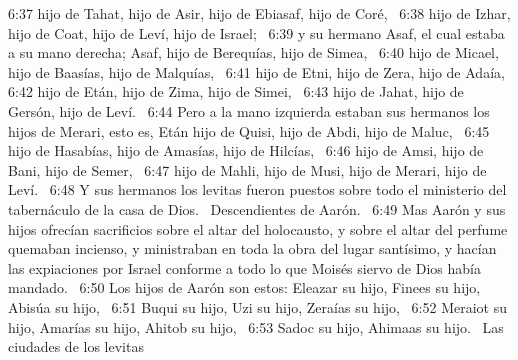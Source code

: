 6:37 hijo de Tahat, hijo de Asir, hijo de Ebiasaf, hijo de Coré,  
6:38 hijo de Izhar, hijo de Coat, hijo de Leví, hijo de Israel;  
6:39 y su hermano Asaf, el cual estaba a su mano derecha; Asaf, hijo de Berequías, hijo de Simea,  
6:40 hijo de Micael, hijo de Baasías, hijo de Malquías,  
6:41 hijo de Etni, hijo de Zera, hijo de Adaía,  
6:42 hijo de Etán, hijo de Zima, hijo de Simei,  
6:43 hijo de Jahat, hijo de Gersón, hijo de Leví.  
6:44 Pero a la mano izquierda estaban sus hermanos los hijos de Merari, esto es, Etán hijo de Quisi, hijo de Abdi, hijo de Maluc,  
6:45 hijo de Hasabías, hijo de Amasías, hijo de Hilcías,  
6:46 hijo de Amsi, hijo de Bani, hijo de Semer,  
6:47 hijo de Mahli, hijo de Musi, hijo de Merari, hijo de Leví.  
6:48 Y sus hermanos los levitas fueron puestos sobre todo el ministerio del tabernáculo de la casa de Dios.  
Descendientes de Aarón.  
6:49 Mas Aarón y sus hijos ofrecían sacrificios sobre el altar del holocausto, y sobre el altar del perfume quemaban incienso, y ministraban en toda la obra del lugar santísimo, y hacían las expiaciones por Israel conforme a todo lo que Moisés siervo de Dios había mandado.  
6:50 Los hijos de Aarón son estos: Eleazar su hijo, Finees su hijo, Abisúa su hijo,  
6:51 Buqui su hijo, Uzi su hijo, Zeraías su hijo,  
6:52 Meraiot su hijo, Amarías su hijo, Ahitob su hijo,  
6:53 Sadoc su hijo, Ahimaas su hijo.  
Las ciudades de los levitas  

